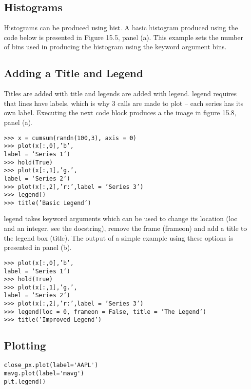 \documentclass[11pt]{article} %
\begin{document}
\subsection{Histograms}

Histograms can be produced using hist. A basic histogram produced using the code below is presented
in Figure 15.5, panel (a). This example sets the number of bins used in producing the histogram using the
keyword argument bins.

\subsection{Adding a Title and Legend}
Titles are added with title and legends are added with legend. legend requires that lines have labels,
which is why 3 calls are made to plot – each series has its own label. Executing the next code block produces
a the image in figure 15.8, panel (a).

\begin{framed}
\begin{verbatim}
>>> x = cumsum(randn(100,3), axis = 0)
>>> plot(x[:,0],’b’,
label = ’Series 1’)
>>> hold(True)
>>> plot(x[:,1],’g.’,
label = ’Series 2’)
>>> plot(x[:,2],’r:’,label = ’Series 3’)
>>> legend()
>>> title(’Basic Legend’)
\end{verbatim}
\end{framed}


legend takes keyword arguments which can be used to change its location (loc and an integer, see the
docstring), remove the frame (frameon) and add a title to the legend box (title). The output of a simple
example using these options is presented in panel (b).



\begin{framed}
\begin{verbatim}
>>> plot(x[:,0],’b’,
label = ’Series 1’)
>>> hold(True)
>>> plot(x[:,1],’g.’,
label = ’Series 2’)
>>> plot(x[:,2],’r:’,label = ’Series 3’)
>>> legend(loc = 0, frameon = False, title = ’The Legend’)
>>> title(’Improved Legend’)
\end{verbatim}
\end{framed}

\newpage
\subsection{Plotting}

\begin{framed}
\begin{verbatim}
close_px.plot(label='AAPL')
mavg.plot(label='mavg')
plt.legend()

\end{verbatim}
\end{framed}
\end{document}
